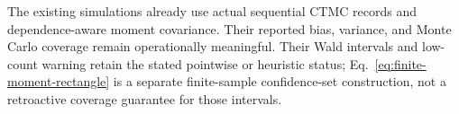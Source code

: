 The existing simulations already use actual sequential CTMC records and
dependence-aware moment covariance. Their reported bias, variance, and
Monte Carlo coverage remain operationally meaningful. Their Wald intervals
and low-count warning retain the stated pointwise or heuristic status;
Eq.~\eqref{eq:finite-moment-rectangle} is a separate finite-sample
confidence-set construction, not a retroactive coverage guarantee for those
intervals.
